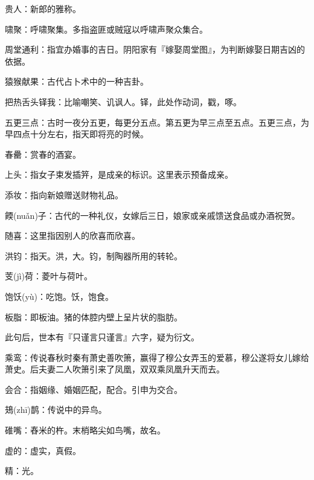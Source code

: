 \startbuffer[2396]
贵人：新郎的雅称。
\stopbuffer


\startbuffer[2397]
啸聚：呼啸聚集。多指盗匪或贼寇以呼啸声聚众集合。
\stopbuffer


\startbuffer[2398]
周堂通利：指宜办婚事的吉日。阴阳家有『嫁娶周堂图』，为判断嫁娶日期吉凶的依据。
\stopbuffer


\startbuffer[2399]
猿猴献果：古代占卜术中的一种吉卦。
\stopbuffer


\startbuffer[2400]
把热舌头铎我：比喻嘲笑、讥讽人。铎，此处作动词，戳，啄。
\stopbuffer


\startbuffer[2401]
五更三点：古时一夜分五更，每更分五点。第五更为早三点至五点。五更三点，为早四点十分左右，指天即将亮的时候。
\stopbuffer


\startbuffer[2402]
春罍：赏春的酒宴。
\stopbuffer


\startbuffer[2403]
上头：指女子束发插笄，是成亲的标识。这里表示预备成亲。
\stopbuffer


\startbuffer[2404]
添妆：指向新娘赠送财物礼品。
\stopbuffer


\startbuffer[2405]
餪(nuǎn)子：古代的一种礼仪，女嫁后三日，娘家或亲戚馈送食品或办酒祝贺。
\stopbuffer


\startbuffer[2406]
随喜：这里指因别人的欣喜而欣喜。
\stopbuffer


\startbuffer[2407]
洪钧：指天。洪，大。钧，制陶器所用的转轮。
\stopbuffer


\startbuffer[2408]
芰(jì)荷：菱叶与荷叶。
\stopbuffer


\startbuffer[2409]
饱饫(yù)：吃饱。饫，饱食。
\stopbuffer


\startbuffer[2410]
板脂：即板油。猪的体腔内壁上呈片状的脂肪。
\stopbuffer


\startbuffer[2411]
此句后，世本有『只谨言只谨言』六字，疑为衍文。
\stopbuffer


\startbuffer[2412]
乘鸾：传说春秋时秦有萧史善吹箫，赢得了穆公女弄玉的爱慕，穆公遂将女儿嫁给萧史。后夫妻二人吹箫引来了凤凰，双双乘凤凰升天而去。
\stopbuffer


\startbuffer[2413]
会合：指姻缘、婚姻匹配，配合。引申为交合。
\stopbuffer


\startbuffer[2414]
鳷(zhī)鹊：传说中的异鸟。
\stopbuffer


\startbuffer[2415]
碓嘴：舂米的杵。末梢略尖如鸟嘴，故名。
\stopbuffer


\startbuffer[2416]
虚的：虚实，真假。
\stopbuffer


\startbuffer[2417]
精：光。
\stopbuffer


